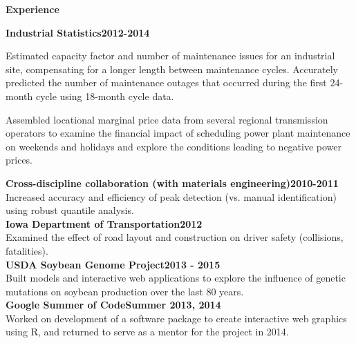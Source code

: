 \documentclass[letterpaper,12pt,final]{memoir}
\newcommand{\SmallSep}{\vspace{0.5em}}
\newcommand{\CVSection}[1]
	{\Large\textbf{#1}\par
	\SmallSep\normalsize\normalfont}
\newcommand{\CVItem}[1]
	{\textbf{\color{RoyalBlue} #1}}
\begin{document}
\CVSection{Experience}
\CVItem{Industrial Statistics\hfill 2012-2014}
\begin{compactitem}[\color{RoyalBlue}$\bullet$]\small
 \item Estimated capacity factor and number of maintenance issues for an industrial site, compensating for a longer length between maintenance cycles. Accurately predicted the number of maintenance outages that occurred during the first 24-month cycle using 18-month cycle data.
 \item Assembled locational marginal price data from several regional transmission operators to examine the financial impact of scheduling power plant maintenance on weekends and holidays and explore the conditions leading to negative power prices. 
\end{compactitem}\SmallSep
\CVItem{Cross-discipline collaboration (with materials engineering)\hfill 2010-2011}\\
{\small 
Increased accuracy and efficiency of peak detection (vs. manual identification) using robust quantile analysis.\SmallSep\\}
\CVItem{Iowa Department of Transportation\hfill 2012}\\
{\small Examined the effect of road layout and construction on driver safety (collisions, fatalities).\SmallSep\\}
\CVItem{USDA Soybean Genome Project\hfill 2013 - 2015}\\
{\small Built models and interactive web applications to explore the influence of genetic mutations on soybean production over the last 80 years.\SmallSep\\}
\CVItem{Google Summer of Code\hfill Summer 2013, 2014}\\
{\small Worked on development of a software package to create interactive web graphics using R, and returned to serve as a mentor for the project in 2014.}

\end{document}
